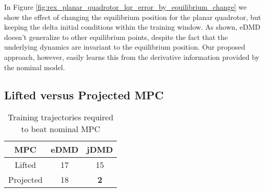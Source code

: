 \documentclass{article}
\begin{document}
In Figure \ref{fig:rex_planar_quadrotor_lqr_error_by_equilibrium_change} we show the effect 
of changing the equilibrium position for the planar quadrotor, but keeping the delta initial
conditions within the training window. As shown, eDMD doesn't generalize to other
equilibrium points, despite the fact that the underlying dynamics are invariant to the
equilibrium position. Our proposed approach, however, easily learns this from the derivative
information provided by the nominal model.

\subsection{Lifted versus Projected MPC}
\begin{wraptable}{r}{5.0cm}
  \vspace{-2\baselineskip}
  \begin{tabular}{ccc}\\
    \toprule  
    MPC       & {\color{orange} \textbf{eDMD}} & {\textbf{\color{cyan} jDMD}} \\
    \midrule
    Lifted    & 17   &          15 \\
    Projected & 18   &  \textbf{2} \\
    \bottomrule
  \end{tabular}
  \caption{Training trajectories required to beat nominal MPC}
  \vspace{-1\baselineskip}
  \label{tab:mpc_comp}
\end{wraptable} 
      
\end{document}
